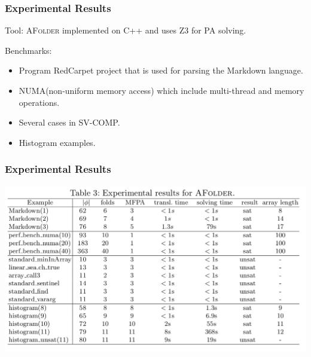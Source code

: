 \documentclass[11pt]{beamer}
\begin{document}
\begin{frame}\frametitle{Experimental Results}
Tool: \textsc{AFolder} implemented on C++ and uses \textsc{Z3} for PA solving.

Benchmarks:
\begin{itemize}
\item Program RedCarpet project that is used for parsing the Markdown language.
\item NUMA(non-uniform memory access) which include multi-thread and memory operations.
\item Several cases in SV-COMP.
\item Histogram examples.
\end{itemize}
\end{frame}
\begin{frame}\frametitle{Experimental Results}
\begin{center}
\includegraphics[scale=0.3]{expresultalf.png}
\end{center}
\end{frame}
\end{document}
